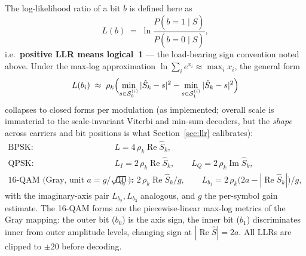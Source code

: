 The log-likelihood ratio of a bit $b$ is defined here as
\begin{equation}
    L(b) \;=\;
    \ln \frac{P(b = 1 \mid \hat{S})}{P(b = 0 \mid \hat{S})},
\end{equation}
i.e.\ \textbf{positive LLR means logical~1} --- the load-bearing sign
convention noted above.  Under the max-log approximation
$\ln \sum_i e^{x_i} \approx \max_i x_i$, the general form
\begin{equation}
    L(b_i) \;\approx\; \rho_k
    \Bigl( \min_{s \in \mathcal{S}_0^{(i)}} |\hat{S}_k - s|^2
         - \min_{s \in \mathcal{S}_1^{(i)}} |\hat{S}_k - s|^2 \Bigr)
\end{equation}
collapses to closed forms per modulation (as implemented; overall
scale is immaterial to the scale-invariant Viterbi and min-sum
decoders, but the \emph{shape} across carriers and bit positions is
what Section~\ref{sec:llr} calibrates):
\begin{align}
    \text{BPSK:}\quad
        & L = 4\,\rho_k \operatorname{Re}\hat{S}_k, \\
    \text{QPSK:}\quad
        & L_I = 2\,\rho_k \operatorname{Re}\hat{S}_k,
    \qquad L_Q = 2\,\rho_k \operatorname{Im}\hat{S}_k, \\
    \text{16-QAM (Gray, unit } a = g/\sqrt{10}\text{):}\quad
        & L_{b_0} = 2\,\rho_k \operatorname{Re}\hat{S}_k / g,
    \qquad L_{b_1} = 2\,\rho_k
        \bigl(2a - |\operatorname{Re}\hat{S}_k|\bigr) / g,
    \label{eq:qam_llr}
\end{align}
with the imaginary-axis pair $L_{b_2}, L_{b_3}$ analogous, and $g$ the
per-symbol gain estimate.  The 16-QAM forms are the piecewise-linear
max-log metrics of the Gray mapping: the outer bit ($b_0$) is the axis
sign, the inner bit ($b_1$) discriminates inner from outer amplitude
levels, changing sign at $|\!\operatorname{Re}\hat S| = 2a$.  All LLRs
are clipped to $\pm 20$ before decoding.
